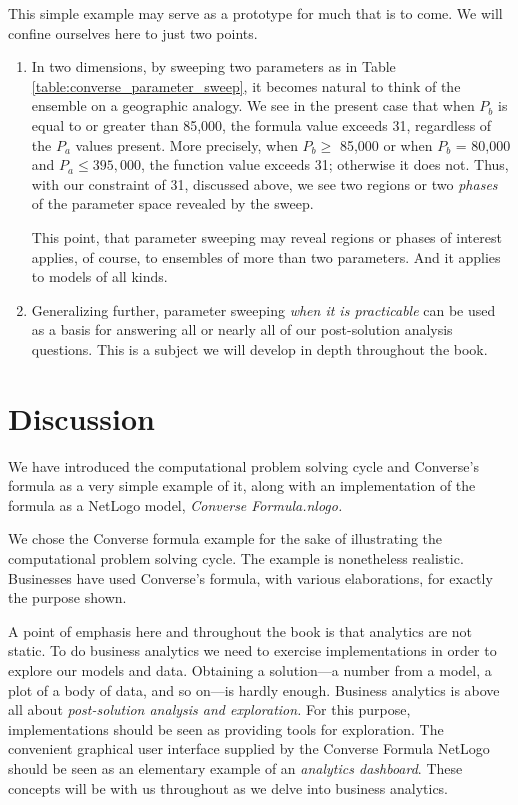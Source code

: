 This simple example may serve as a prototype for much that is to come. We will confine ourselves here to just two points.
\begin{enumerate}
\item In two dimensions, by sweeping two parameters as in Table \ref{table:converse_parameter_sweep}, it becomes natural to think of the ensemble on a geographic analogy. We see in the present case that when $P_b$ is equal to or greater than 85,000, the formula value exceeds 31, regardless of the $P_a$ values present. More precisely, when $P_b \ge$ 85,000 or when $P_b$ = 80,000 and $P_a \le 395,000$, the function value exceeds 31; otherwise it does not. Thus, with our constraint of 31, discussed above, we see two regions or two \emph{phases} of the parameter space revealed by the sweep.

This point, that parameter sweeping may reveal regions or phases of interest applies, of course, to ensembles of more than two parameters. And it applies to models of all kinds.

\item Generalizing further, parameter sweeping \emph{when it is practicable} can be used as a basis for answering all or nearly all of our post-solution analysis questions. This is a subject we will develop in depth throughout the book.
\end{enumerate}

\section{Discussion}

We have introduced the computational problem solving cycle and Converse's formula as a very simple example of it, along with an implementation of the formula as a NetLogo model, {\it Converse Formula.nlogo.}

We chose the Converse formula example  for the sake of illustrating the computational problem solving cycle.
The example is nonetheless realistic.  Businesses have used Converse's formula, with various elaborations, for exactly the purpose shown.

A point of emphasis here and throughout the book is that analytics are not static. To do business analytics we need to exercise implementations in order to  explore our models and data.  Obtaining a solution---a number from a model, a plot of a body of data, and so on---is hardly enough. Business analytics is above all about \emph{post-solution analysis and exploration.}
For this purpose, implementations  should be seen as providing tools for exploration. The convenient graphical user interface  supplied by the Converse Formula NetLogo should be seen as an elementary example of an \emph{analytics dashboard}. These concepts will be with us throughout as we delve into business analytics.



